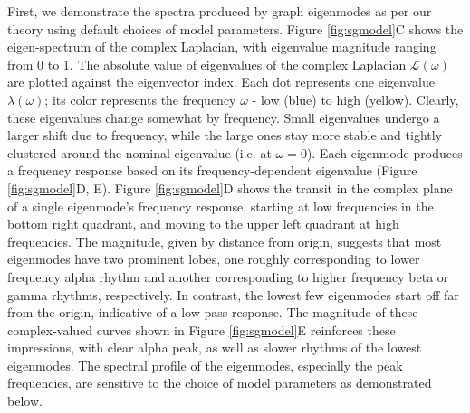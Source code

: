 First, we demonstrate the spectra produced by graph eigenmodes as per
our theory using default choices of model parameters. Figure \ref{fig:sgmodel}C
shows the eigen-spectrum of the complex Laplacian, with eigenvalue
magnitude ranging from 0 to 1. The absolute value of eigenvalues of the
complex Laplacian $\mathcal{L}(\omega)$ are plotted against the
eigenvector index. Each dot represents one eigenvalue
$\lambda(\omega)$; its color represents the frequency $\omega$ - low
(blue) to high (yellow). Clearly, these eigenvalues change somewhat by
frequency. Small eigenvalues undergo a larger shift due to frequency,
while the large ones stay more stable and tightly clustered around the
nominal eigenvalue (i.e. at $\omega = 0$). Each eigenmode produces a
frequency response based on its frequency-dependent eigenvalue
(Figure \ref{fig:sgmodel}D, E). Figure \ref{fig:sgmodel}D shows the transit in the
complex plane of a single eigenmode's frequency response, starting at
low frequencies in the bottom right quadrant, and moving to the upper
left quadrant at high frequencies. The magnitude, given by distance from
origin, suggests that most eigenmodes have two prominent lobes, one
roughly corresponding to lower frequency alpha rhythm and another
corresponding to higher frequency beta or gamma rhythms, respectively.
In contrast, the lowest few eigenmodes start off far from the origin,
indicative of a low-pass response. The magnitude of these complex-valued
curves shown in Figure \ref{fig:sgmodel}E reinforces these impressions, with clear alpha
peak, as well as slower rhythms of the lowest eigenmodes. The spectral
profile of the eigenmodes, especially the peak frequencies, are
sensitive to the choice of model parameters as demonstrated below.

